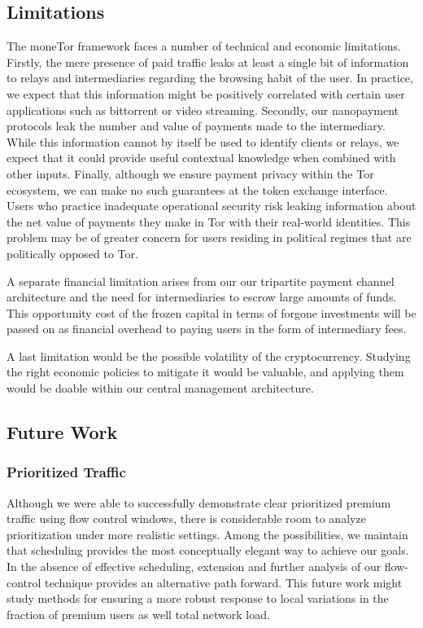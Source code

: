 \subsection{Limitations}
\label{subsec:limitations}

The moneTor framework faces a number of technical and economic
limitations. Firstly, the mere presence of paid traffic leaks at least a single
bit of information to relays and intermediaries regarding the browsing habit of
the user. In practice, we expect that this information might be positively
correlated with certain user applications such as bittorrent or video
streaming. Secondly, our nanopayment protocols leak the number and value of
payments made to the intermediary. While this information cannot by itself be
used to identify clients or relays, we expect that it could provide useful
contextual knowledge when combined with other inputs. Finally, although we
ensure payment privacy within the Tor ecosystem, we can make no such guarantees
at the token exchange interface. Users who practice inadequate operational
security risk leaking information about the net value of payments they make in
Tor with their real-world identities. This problem may be of greater concern for
users residing in political regimes that are politically opposed to Tor.

A separate financial limitation arises from our our tripartite payment channel
architecture and the need for intermediaries to escrow large amounts of
funds. This opportunity cost of the frozen capital in terms of forgone
investments will be passed on as financial overhead to paying users in the form
of intermediary fees.

A last limitation would be the possible volatility of the cryptocurrency. Studying the right economic policies to mitigate it would be valuable, and applying them would be doable within our central management architecture.

\subsection{Future Work}
\label{subsec:future_work}

\subsubsection{Prioritized Traffic} Although we were able to successfully demonstrate
clear prioritized premium traffic using flow control windows, there is
considerable room to analyze prioritization under more realistic settings. Among
the possibilities, we maintain that scheduling provides the most conceptually
elegant way to achieve our goals. In the absence of effective scheduling,
extension and further analysis of our flow-control technique provides an
alternative path forward. This future work might study methods for ensuring a
more robust response to local variations in the fraction of premium users as
well total network load.

